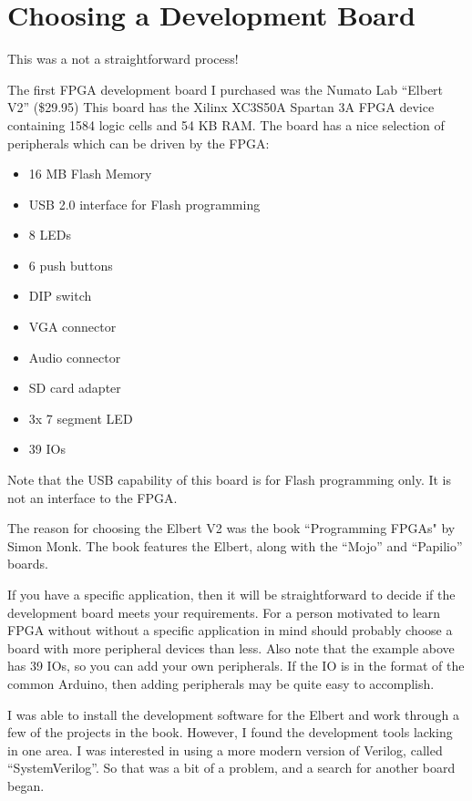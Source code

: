 \section{Choosing a Development Board}

This was a not a straightforward process!

The first FPGA development board I purchased was the Numato Lab ``Elbert V2'' (\$29.95)
This board has the Xilinx XC3S50A Spartan 3A FPGA device containing 1584 logic cells and
54 KB RAM.  The board has a nice selection of peripherals which can be driven
by the FPGA:

\begin{itemize}
	\item 16 MB Flash Memory
	\item USB 2.0 interface for Flash programming
	\item 8 LEDs
	\item 6 push buttons
	\item DIP switch
	\item VGA connector
	\item Audio connector
	\item SD card adapter
	\item 3x 7 segment LED
	\item 39 IOs
\end{itemize}

Note that the USB capability of this board is for Flash programming only.  It is not an interface to the FPGA.

The reason for choosing the Elbert V2 was the book ``Programming FPGAs" by Simon Monk.  The book features the Elbert, along with the ``Mojo'' and ``Papilio'' boards.

If you have a specific application, then it will be straightforward to decide if the development board meets your requirements.  For a person motivated to learn FPGA without without a specific application in mind should probably choose a board with more peripheral devices than less.  Also note that the example above has 39 IOs, so you can add your own peripherals.  If the IO is in the format of the common Arduino, then adding peripherals may be quite easy to accomplish.

I was able to install the development software for the Elbert and work through a few of the projects in the book.
However, I found the development tools lacking in one area.  I was interested in using a more modern version of Verilog, called ``SystemVerilog''.  So that was a bit of a problem, and a search for another board began.

